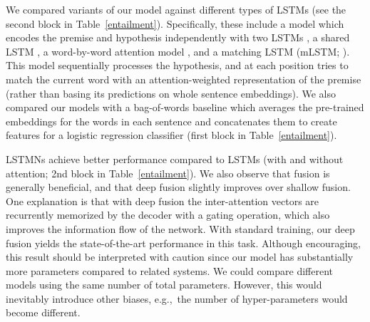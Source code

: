 \documentclass[11pt,letterpaper]{article}
\begin{document}
	We compared variants of our model against different types of
        LSTMs (see the second block in
        Table~\ref{entailment}). Specifically, these include a model
        which encodes the premise and hypothesis independently with
        two LSTMs \cite{bowman2015large}, a shared LSTM
        \cite{rocktaschel2015reasoning}, a word-by-word attention
        model \cite{rocktaschel2015reasoning}, and a matching LSTM
        (mLSTM; ). This model sequentially
        processes the hypothesis, and at each position tries to match
        the current word with an attention-weighted representation of
        the premise (rather than basing its predictions on whole
        sentence embeddings).  We also compared our models with a
        bag-of-words baseline which averages the pre-trained
        embeddings for the words in each sentence and
        concatenates them to create features for a logistic regression
        classifier (first block in Table~\ref{entailment}).  

        LSTMNs achieve better performance compared to LSTMs (with and
        without attention; 2nd block in Table~\ref{entailment}).  We
        also observe that fusion is generally beneficial, and that
        deep fusion slightly improves over shallow fusion. One
        explanation is that with deep fusion the inter-attention
        vectors are recurrently memorized by the decoder with a gating
        operation, which also improves the information flow of the
        network. With standard training, our deep fusion yields the
        state-of-the-art performance in this task. Although
        encouraging, this result should be interpreted with caution
        since our model has substantially more parameters compared to
        related systems. We could compare different models using the
        same number of total parameters. However, this would
        inevitably introduce other biases, e.g.,~the number of
        hyper-parameters would become different.
\end{document}
